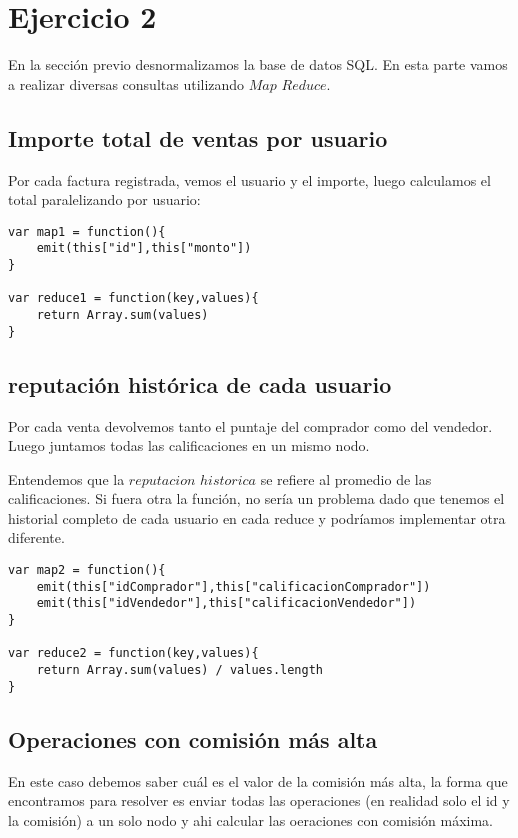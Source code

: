 \section{Ejercicio 2}

En la sección previo desnormalizamos la base de datos SQL. En esta parte vamos a realizar diversas consultas utilizando $Map$ $Reduce$.

\subsection{Importe total de ventas por usuario}

Por cada factura registrada, vemos el usuario y el importe, luego calculamos el total paralelizando por usuario: \\

\begin{verbatim}
var map1 = function(){
    emit(this["id"],this["monto"])
}

var reduce1 = function(key,values){
    return Array.sum(values)
}
\end{verbatim}

\subsection{reputación histórica de cada usuario}
Por cada venta devolvemos tanto el puntaje del comprador como del vendedor. Luego juntamos todas las calificaciones en un mismo nodo.


Entendemos que la $reputacion$ $historica$ se refiere al promedio de las calificaciones. Si fuera otra la función, no sería un problema dado que tenemos el historial completo de cada usuario en cada reduce y podríamos implementar otra diferente.

\begin{verbatim}
var map2 = function(){
    emit(this["idComprador"],this["calificacionComprador"])
    emit(this["idVendedor"],this["calificacionVendedor"])
}

var reduce2 = function(key,values){
    return Array.sum(values) / values.length
}
\end{verbatim}

\subsection{Operaciones con comisión más alta}

En este caso debemos saber cuál es el valor de la comisión más alta, la forma que encontramos para resolver es enviar todas las operaciones (en realidad solo el id y la comisión) a un solo nodo y ahi calcular las oeraciones con comisión máxima.

